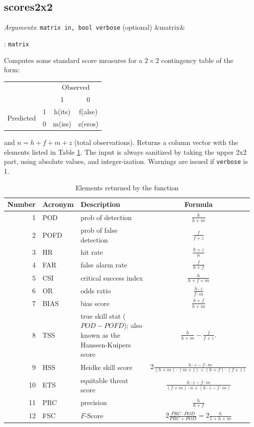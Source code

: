 \documentclass[11pt,english]{article}
\newcommand{\ArgRet}[2]{%
  {\it Arguments}: {#1}%
  \ifx&#2&%
  \else
  \par\smallskip\noindent {\it Return type}: \texttt{#2}
  \fi%
  \par\medskip\par%
  }
\begin{document}
\subsection{scores2x2}

\ArgRet{\texttt{matrix in, bool verbose} (optional)}{matrix}

Computes some standard score measures for a $2\times 2$ contingency
table of the form:

\begin{center}
\begin{tabular}{cccc}
\toprule
 &  & \multicolumn{2}{c}{Observed}\\
 &  & 1 & 0\\
\midrule
\multirow{2}{*}{Predicted} & 1 & h(its) & f(alse)\\
 & 0 & m(iss) & z(eros)\\
\bottomrule
\end{tabular}
\end{center}

\noindent and $n=h+f+m+z$ (total observations). Returns a column
vector with the elements listed in Table \ref{tab:scores2x2}. The
input is always sanitized by taking the upper 2x2 part, using absolute
values, and integer-ization. Warnings are issued if \texttt{verbose}
is 1.


\begin{table}[htbp]
\begin{tabular}{rlp{}c}
  \hline
  \textbf{Number} &\textbf{Acronym} &  \textbf{Description} &\textbf{Formula} \\
  \hline
  1 & POD & prob of detection & $\frac{h}{h+m}$ \\
2 & POFD & prob of false detection & $\frac{f}{f+z}$ \\
3 & HR & hit rate & $\frac{h+z}{n}$ \\
4 & FAR & false alarm rate & $\frac{f}{h+f}$ \\
5 & CSI & critical success index & $\frac{h}{h+f+m}$\\
6 & OR & odds ratio & $\frac{h \cdot z}{f \cdot m}$\\
7 & BIAS & bias score & $\frac{h+f}{h+m}$\\
8 & TSS & true skill stat ($POD-POFD$); also known as the
          Hanssen-Kuipers score & $\frac{h}{h+m} -\frac{f}{f+z}$. \\
9 & HSS & Heidke skill score & $2 \frac{h \cdot z - f \cdot m}{(h+m) \cdot (m+z)+(h+f) \cdot (f+z)}$ \\
10 & ETS & equitable threat score & $\frac{h \cdot z-f \cdot m}{(f+m) \cdot n+(h \cdot z-f \cdot m)}$ \\
11 & PRC & precision & $\frac{h}{h+f}$ \\
12 & FSC & $F$-Score & $2 \frac{PRC \cdot POD}{PRC+POD} = 2 \frac{h}{1+h+m}$\\ \hline
\end{tabular}
\caption{Elements returned by the  function}
\label{tab:scores2x2}
\end{table}
\end{document}
